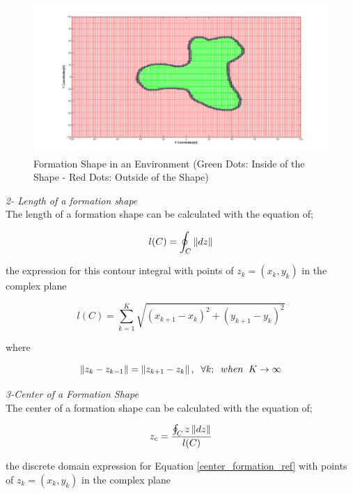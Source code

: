 \begin{figure}[H]
\caption{Formation Shape in an Environment (Green Dots: Inside of the Shape - Red Dots: Outside of the Shape)}
\centering			
\includegraphics[scale = 0.30]{iceride_disarida}
\end{figure}

\textit{ 	2- Length of a formation shape} \\ 
The length of a formation shape can be calculated with the equation of;
		
\begin{equation}
l(C)= \oint_C \left\lVert dz\right\rVert
\end{equation}
		
the expression for this contour integral with points of   $z_k = (x_k,y_k)$ in the complex plane

\begin{equation}
l(C) = \sum_{k=1}^{K}\sqrt{(x_{k+1} - x_k)^2 + (y_{k+1} - y_k)^2}
\end{equation}

where

\begin{equation}
\left\lVert z_k - z_{k-1}\right\rVert = \left\lVert z_{k+1} - z_k\right\rVert, \hspace{0.2cm}  \forall k ;  \hspace{0.2cm} when  \hspace{0.2cm} K \to\infty
\end{equation}
		
\textit{ 	3-Center of a Formation Shape} \\ 	
The center of a formation shape can be calculated with the equation of;

\begin{equation} \label{center_formation_ref}
 z_c = \frac{\oint_C z\left\lVert dz\right\rVert}{l(C)}
\end{equation}
		
the discrete domain expression for Equation \ref{center_formation_ref} with points of  $z_k = (x_k,y_k)$ in the complex plane

